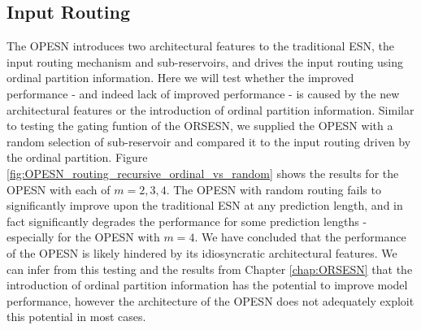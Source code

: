 \subsection{Input Routing}

The OPESN introduces two architectural features to the traditional ESN, the input routing mechanism and sub-reservoirs, and drives the input routing using ordinal partition information. Here we will test whether the improved performance - and indeed lack of improved performance - is caused by the new architectural features or the introduction of ordinal partition information. Similar to testing the gating funtion of the ORSESN, we supplied the OPESN with a random selection of sub-reservoir and compared it to the input routing driven by the ordinal partition. Figure \ref{fig:OPESN_routing_recursive_ordinal_vs_random} shows the results for the OPESN with each of $m=2,3,4$. The OPESN with random routing fails to significantly improve upon the traditional ESN at any prediction length, and in fact significantly degrades the performance for some prediction lengths - especially for the OPESN with $m=4$. We have concluded that the performance of the OPESN is likely hindered by its idiosyncratic architectural features. We can infer from this testing and the results from Chapter \ref{chap:ORSESN} that the introduction of ordinal partition information has the potential to improve model performance, however the architecture of the OPESN does not adequately exploit this potential in most cases.

